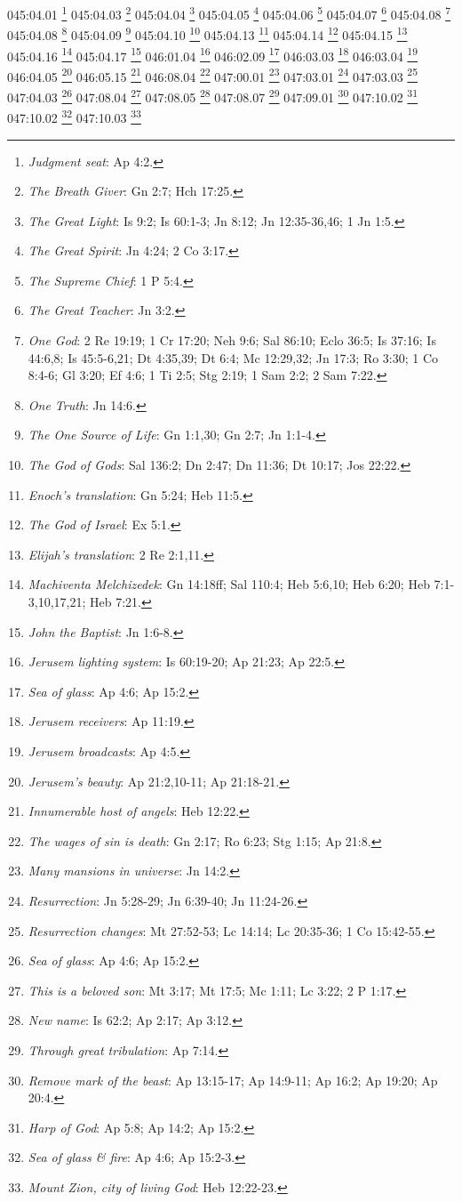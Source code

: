 045:04.01 \footnote{\textit{Judgment seat}: Ap 4:2.}
045:04.03 \footnote{\textit{The Breath Giver}: Gn 2:7; Hch 17:25.}
045:04.04 \footnote{\textit{The Great Light}: Is 9:2; Is 60:1-3; Jn 8:12; Jn 12:35-36,46; 1 Jn 1:5.}
045:04.05 \footnote{\textit{The Great Spirit}: Jn 4:24; 2 Co 3:17.}
045:04.06 \footnote{\textit{The Supreme Chief}: 1 P 5:4.}
045:04.07 \footnote{\textit{The Great Teacher}: Jn 3:2.}
045:04.08 \footnote{\textit{One God}: 2 Re 19:19; 1 Cr 17:20; Neh 9:6; Sal 86:10; Eclo 36:5; Is 37:16; Is 44:6,8; Is 45:5-6,21; Dt 4:35,39; Dt 6:4; Mc 12:29,32; Jn 17:3; Ro 3:30; 1 Co 8:4-6; Gl 3:20; Ef 4:6; 1 Ti 2:5; Stg 2:19; 1 Sam 2:2; 2 Sam 7:22.}
045:04.08 \footnote{\textit{One Truth}: Jn 14:6.}
045:04.09 \footnote{\textit{The One Source of Life}: Gn 1:1,30; Gn 2:7; Jn 1:1-4.}
045:04.10 \footnote{\textit{The God of Gods}: Sal 136:2; Dn 2:47; Dn 11:36; Dt 10:17; Jos 22:22.}
045:04.13 \footnote{\textit{Enoch's translation}: Gn 5:24; Heb 11:5.}
045:04.14 \footnote{\textit{The God of Israel}: Ex 5:1.}
045:04.15 \footnote{\textit{Elijah's translation}: 2 Re 2:1,11.}
045:04.16 \footnote{\textit{Machiventa Melchizedek}: Gn 14:18ff; Sal 110:4; Heb 5:6,10; Heb 6:20; Heb 7:1-3,10,17,21; Heb 7:21.}
045:04.17 \footnote{\textit{John the Baptist}: Jn 1:6-8.}
046:01.04 \footnote{\textit{Jerusem lighting system}: Is 60:19-20; Ap 21:23; Ap 22:5.}
046:02.09 \footnote{\textit{Sea of glass}: Ap 4:6; Ap 15:2.}
046:03.03 \footnote{\textit{Jerusem receivers}: Ap 11:19.}
046:03.04 \footnote{\textit{Jerusem broadcasts}: Ap 4:5.}
046:04.05 \footnote{\textit{Jerusem's beauty}: Ap 21:2,10-11; Ap 21:18-21.}
046:05.15 \footnote{\textit{Innumerable host of angels}: Heb 12:22.}
046:08.04 \footnote{\textit{The wages of sin is death}: Gn 2:17; Ro 6:23; Stg 1:15; Ap 21:8.}
047:00.01 \footnote{\textit{Many mansions in universe}: Jn 14:2.}
047:03.01 \footnote{\textit{Resurrection}: Jn 5:28-29; Jn 6:39-40; Jn 11:24-26.}
047:03.03 \footnote{\textit{Resurrection changes}: Mt 27:52-53; Lc 14:14; Lc 20:35-36; 1 Co 15:42-55.}
047:04.03 \footnote{\textit{Sea of glass}: Ap 4:6; Ap 15:2.}
047:08.04 \footnote{\textit{This is a beloved son}: Mt 3:17; Mt 17:5; Mc 1:11; Lc 3:22; 2 P 1:17.}
047:08.05 \footnote{\textit{New name}: Is 62:2; Ap 2:17; Ap 3:12.}
047:08.07 \footnote{\textit{Through great tribulation}: Ap 7:14.}
047:09.01 \footnote{\textit{Remove mark of the beast}: Ap 13:15-17; Ap 14:9-11; Ap 16:2; Ap 19:20; Ap 20:4.}
047:10.02 \footnote{\textit{Harp of God}: Ap 5:8; Ap 14:2; Ap 15:2.}
047:10.02 \footnote{\textit{Sea of glass & fire}: Ap 4:6; Ap 15:2-3.}
047:10.03 \footnote{\textit{Mount Zion, city of living God}: Heb 12:22-23.}
